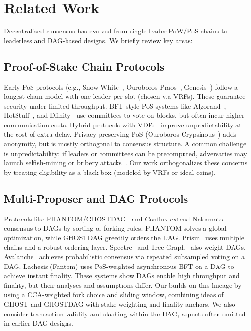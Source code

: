 
\section{Related Work}
\label{sec:related}

Decentralized consensus has evolved from single-leader PoW/PoS chains to leaderless and DAG-based designs. We briefly review key areas:

\subsection{Proof-of-Stake Chain Protocols}
Early PoS protocols (e.g., Snow White~\cite{FC:DaiPasShi19}, Ouroboros Praos~\cite{EC:DGKR18}, Genesis~\cite{CCS:BGKRZ18}) follow a longest-chain model with one leader per slot (chosen via VRFs). These guarantee security under limited throughput. BFT-style PoS systems like Algorand~\cite{Algorand}, HotStuff~\cite{HotStuff}, and Dfinity~\cite{Dfinity} use committees to vote on blocks, but often incur higher communication costs. Hybrid protocols with VDFs~\cite{FC:DebCabTse21} improve unpredictability at the cost of extra delay. Privacy-preserving PoS (Ouroboros Crypsinous~\cite{SP:KKKZ19}) adds anonymity, but is mostly orthogonal to consensus structure. A common challenge is unpredictability: if leaders or committees can be precomputed, adversaries may launch selfish-mining or bribery attacks~\cite{FKLTZ24,rationalattacksPOS}. Our work orthogonalizes these concerns by treating eligibility as a black box (modeled by VRFs or ideal coins).

\subsection{Multi-Proposer and DAG Protocols}
Protocols like PHANTOM/GHOSTDAG~\cite{AFT:SWZ21} and Conflux extend Nakamoto consensus to DAGs by sorting or forking rules. PHANTOM solves a global optimization, while GHOSTDAG greedily orders the DAG. Prism~\cite{Prism} uses multiple chains and a robust ordering layer. Spectre~\cite{EPRINT:MorKulYok18} and Tree-Graph~\cite{EPRINT:ZhaChaLeo18} also weight DAGs. Avalanche~\cite{SnowFamily} achieves probabilistic consensus via repeated subsampled voting on a DAG. Lachesis (Fantom) uses PoS-weighted asynchronous BFT on a DAG to achieve instant finality. These systems show DAGs enable high throughput and finality, but their analyses and assumptions differ. Our \Proj builds on this lineage by using a CCA-weighted fork choice and sliding window, combining ideas of GHOST and GHOSTDAG with stake weighting and finality anchors. We also consider transaction validity and slashing within the DAG, aspects often omitted in earlier DAG designs.

